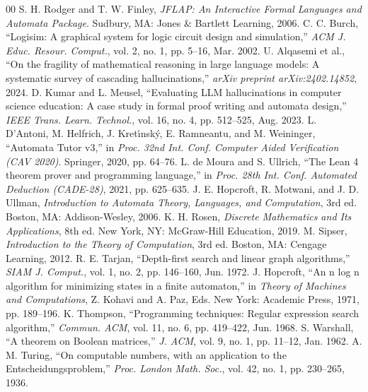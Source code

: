 \documentclass[conference]{IEEEtran}
\begin{document}
\begin{thebibliography}{00}
 S. H. Rodger and T. W. Finley, \textit{JFLAP: An Interactive Formal Languages and Automata Package}. Sudbury, MA: Jones \& Bartlett Learning, 2006.
 C. C. Burch, ``Logisim: A graphical system for logic circuit design and simulation,'' \textit{ACM J. Educ. Resour. Comput.}, vol. 2, no. 1, pp. 5--16, Mar. 2002.
 U. Alqasemi et al., ``On the fragility of mathematical reasoning in large language models: A systematic survey of cascading hallucinations,'' \textit{arXiv preprint arXiv:2402.14852}, 2024.
 D. Kumar and L. Meusel, ``Evaluating LLM hallucinations in computer science education: A case study in formal proof writing and automata design,'' \textit{IEEE Trans. Learn. Technol.}, vol. 16, no. 4, pp. 512--525, Aug. 2023.
 L. D'Antoni, M. Helfrich, J. Kret\'{\i}nsk\'{y}, E. Ramneantu, and M. Weininger, ``Automata Tutor v3,'' in \textit{Proc. 32nd Int. Conf. Computer Aided Verification (CAV 2020)}. Springer, 2020, pp. 64--76.
 L. de Moura and S. Ullrich, ``The Lean 4 theorem prover and programming language,'' in \textit{Proc. 28th Int. Conf. Automated Deduction (CADE-28)}, 2021, pp. 625--635.
 J. E. Hopcroft, R. Motwani, and J. D. Ullman, \textit{Introduction to Automata Theory, Languages, and Computation}, 3rd ed. Boston, MA: Addison-Wesley, 2006.
 K. H. Rosen, \textit{Discrete Mathematics and Its Applications}, 8th ed. New York, NY: McGraw-Hill Education, 2019.
 M. Sipser, \textit{Introduction to the Theory of Computation}, 3rd ed. Boston, MA: Cengage Learning, 2012.
 R. E. Tarjan, ``Depth-first search and linear graph algorithms,'' \textit{SIAM J. Comput.}, vol. 1, no. 2, pp. 146--160, Jun. 1972.
 J. Hopcroft, ``An n log n algorithm for minimizing states in a finite automaton,'' in \textit{Theory of Machines and Computations}, Z. Kohavi and A. Paz, Eds. New York: Academic Press, 1971, pp. 189--196.
 K. Thompson, ``Programming techniques: Regular expression search algorithm,'' \textit{Commun. ACM}, vol. 11, no. 6, pp. 419--422, Jun. 1968.
 S. Warshall, ``A theorem on Boolean matrices,'' \textit{J. ACM}, vol. 9, no. 1, pp. 11--12, Jan. 1962.
 A. M. Turing, ``On computable numbers, with an application to the Entscheidungsproblem,'' \textit{Proc. London Math. Soc.}, vol. 42, no. 1, pp. 230--265, 1936.

\end{thebibliography}
\end{document}
